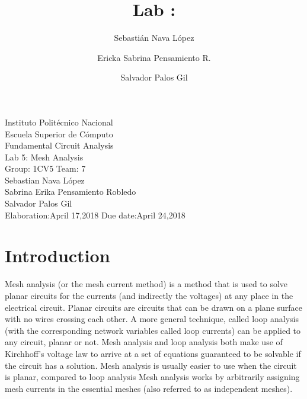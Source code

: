 \documentclass[letterpaper]{article}
\title{Lab :}
\author{
    Sebastián Nava López\\
    \and
    Ericka Sabrina Pensamiento R.\\
    \and
    Salvador Palos Gil
}
\begin{document}
\begin{titlepage}
    \centering
    {\Huge Instituto Politécnico Nacional}\\[3ex]
    {\huge Escuela Superior de Cómputo}\\[8ex]
    {\huge Fundamental Circuit Analysis}\\[12ex]
    {\Large Lab 5: Mesh Analysis}\\[20ex]
    {\Large Group: 1CV5 Team: 7 \\[8ex]
    Sebastian Nava López\\[4ex]
    Sabrina Erika Pensamiento Robledo\\[4ex]
    Salvador Palos Gil\\[18ex]
    }
    \large{Elaboration:April 17,2018 \hspace{8em} Due date:April 24,2018}
\end{titlepage}
\tableofcontents
\newpage
\section{Introduction}
Mesh analysis (or the mesh current method) is a method that is used to solve planar circuits for the currents 
(and indirectly the voltages) at any place in the electrical circuit. Planar circuits are circuits that can be 
drawn on a plane surface with no wires crossing each other. A more general technique, called loop analysis 
(with the corresponding network variables called loop currents) can be applied to any circuit, planar or not.
Mesh analysis and loop analysis both make use of Kirchhoff’s voltage law to arrive at a set 
of equations guaranteed to be solvable if the circuit has a solution. Mesh analysis is usually easier to use 
when the circuit is planar, compared to loop analysis
Mesh analysis works by arbitrarily assigning mesh currents in the essential meshes (also referred to as independent meshes). 
\end{document}
